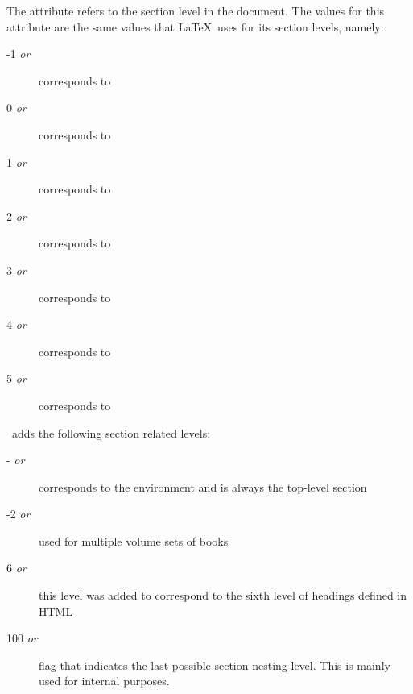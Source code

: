 The  attribute refers to the section level in the document.
The values for this attribute are the same values that \LaTeX\ uses
for its section levels, namely:
\begin{description}
\item[-1 {\it or} ] corresponds to 
\item[0 {\it or} ] corresponds to 
\item[1 {\it or} ] corresponds to 
\item[2 {\it or} ] corresponds to 
\item[3 {\it or} ] corresponds to 
\item[4 {\it or} ] corresponds to 
\item[5 {\it or} ] corresponds to 
\end{description}

\plasTeX\ adds the following section related levels:
\begin{description}
\item[- {\it or} ] 
    corresponds to the  environment and 
    is always the top-level section
\item[-2 {\it or} ]
    used for multiple volume sets of books
\item[6 {\it or} ]
    this level was added to correspond to the sixth level of headings
    defined in HTML
\item[100 {\it or} ]
    flag that indicates the last possible section nesting level.  This is 
    mainly used for internal purposes.
\end{description}


